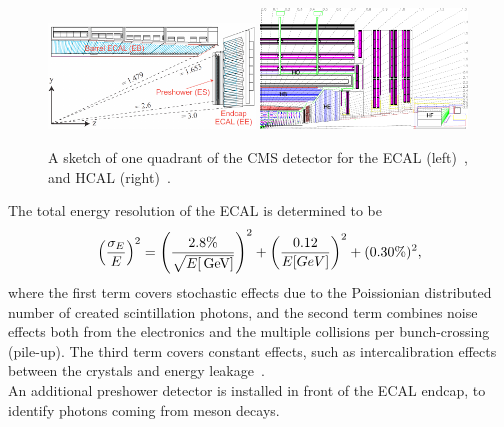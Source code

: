 \begin{figure}[hbtp]
 \centering
 \includegraphics[width=0.49\textwidth]{figures/general/ecal}
 \includegraphics[width=0.49\textwidth]{figures/general/hcal}
 \caption{A sketch of one quadrant of the CMS detector for the ECAL (left)~\cite{ECALPicture}, and HCAL (right)~\cite{CMS}.}
 \label{fig:etaPlaneCMS}
\end{figure}
The total energy resolution of the ECAL is determined to be
\begin{equation}
 \left(\frac{\sigma_E}{E}\right)^2=\left(\frac{2.8\%}{\sqrt{E[\,\text{Ge\hspace{-.08em}V}]}}\right)^2 + \left(\frac{0.12}{E[GeV]}\right)^2 + (0.30\%)^2,
\end{equation}
where the first term covers stochastic effects due to the Poissionian distributed number of created scintillation photons, and the second term combines noise effects both from the electronics and the multiple collisions per bunch-crossing (pile-up). The third term covers constant effects, such as intercalibration effects between the crystals and energy leakage~\cite{ECALRes}.\\
An additional preshower detector is installed in front of the ECAL endcap, to identify photons coming from meson decays.

